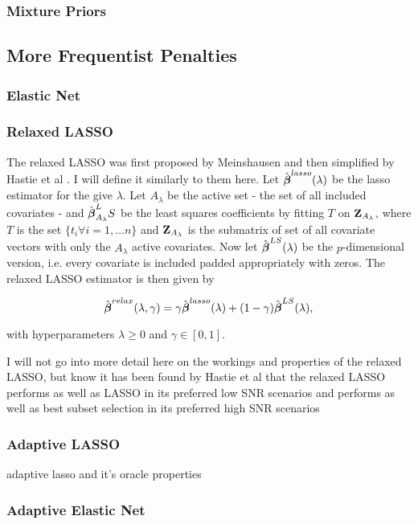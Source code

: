 \subsubsection{Mixture Priors}
\subsection{More Frequentist Penalties}
\subsubsection{Elastic Net}
\subsubsection{Relaxed LASSO}

The relaxed LASSO was first proposed by Meinshausen  and then simplified by Hastie et al . I will define it similarly to them here. Let $\hat{\boldsymbol{\beta}}^{lasso}(\lambda)$ be the lasso estimator for the give $\lambda$. Let $A_\lambda$ be the active set - the set of all included covariates - and $\hat{\boldsymbol{\beta}}_{A_\lambda}^LS$ be the least squares coefficients by fitting $T$ on $\textbf{Z}_{A_\lambda}$, where $T$ is the set $\{t_i\forall i=1,\ldots n\}$ and $\textbf{Z}_{A_\lambda}$ is the submatrix of set of all covariate vectors with only the $A_\lambda$ active covariates. Now let $\hat{\boldsymbol{\beta}}^{LS}(\lambda)$ be the $p$-dimensional version, i.e. every covariate is included padded appropriately with zeros. The relaxed LASSO estimator is then given by

\begin{equation}
    \hat{\boldsymbol{\beta}}^{relax}(\lambda,\gamma)=\gamma\hat{\boldsymbol{\beta}}^{lasso}(\lambda)+(1-\gamma)\hat{\boldsymbol{\beta}}^{LS}(\lambda),
\end{equation}

with hyperparameters $\lambda\geq0$ and $\gamma\in[0,1]$.

I will not go into more detail here on the workings and properties of the relaxed LASSO, but know it has been found by Hastie et al  that the relaxed LASSO performs as well as LASSO in its preferred low SNR scenarios and performs as well as best subset selection in its preferred high SNR scenarios

\subsubsection{Adaptive LASSO}
adaptive lasso and it's oracle properties
\subsubsection{Adaptive Elastic Net}
